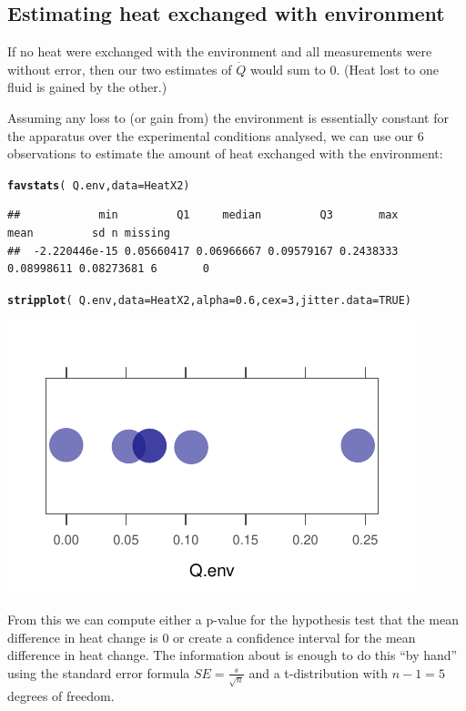 \documentclass[twoside]{book}\usepackage[]{graphicx}\usepackage[]{xcolor}
\makeatletter
\def\maxwidth{ %
  \ifdim\Gin@nat@width>\linewidth
    \linewidth
  \else
    \Gin@nat@width
  \fi
}
\newcommand{\hlnum}[1]{\textcolor[rgb]{0.686,0.059,0.569}{#1}}%
\newcommand{\hlopt}[1]{\textcolor[rgb]{0,0,0}{#1}}%
\newcommand{\hlstd}[1]{\textcolor[rgb]{0.345,0.345,0.345}{#1}}%
\newcommand{\hlkwc}[1]{\textcolor[rgb]{0.333,0.667,0.333}{#1}}%
\newcommand{\hlkwd}[1]{\textcolor[rgb]{0.737,0.353,0.396}{\textbf{#1}}}%
\newenvironment{kframe}{%
 \def\at@end@of@kframe{}%
 \ifinner\ifhmode%
  \def\at@end@of@kframe{\end{minipage}}%
  \begin{minipage}{\columnwidth}%
 \fi\fi%
 \def\FrameCommand##1{\hskip\@totalleftmargin \hskip-\fboxsep
 \colorbox{shadecolor}{##1}\hskip-\fboxsep
     \hskip-\linewidth \hskip-\@totalleftmargin \hskip\columnwidth}%
 \MakeFramed {\advance\hsize-\width
   \@totalleftmargin\z@ \linewidth\hsize
   \@setminipage}}%
 {\par\unskip\endMakeFramed%
 \at@end@of@kframe}
\newenvironment{knitrout}{}{} %
\makeatother
\begin{document}
\subsection{Estimating heat exchanged with environment}
If no heat were exchanged with the environment and all measurements were without error,
then our two estimates of $\dot Q$ would sum to 0.  (Heat lost to one fluid is gained by the 
other.)  

Assuming any loss to (or gain from) the environment is essentially constant for
the apparatus over the experimental conditions analysed, we can use our 6
observations to estimate the amount of heat exchanged with the environment:
\begin{knitrout}
\color{fgcolor}\begin{kframe}
\begin{alltt}
\hlkwd{favstats}\hlstd{(}\hlopt{~}\hlstd{Q.env,} \hlkwc{data} \hlstd{= HeatX2)}
\end{alltt}
\begin{verbatim}
##            min         Q1     median         Q3       max       mean         sd n missing
##  -2.220446e-15 0.05660417 0.06966667 0.09579167 0.2438333 0.08998611 0.08273681 6       0
\end{verbatim}
\begin{alltt}
\hlkwd{stripplot}\hlstd{(}\hlopt{~}\hlstd{Q.env,} \hlkwc{data} \hlstd{= HeatX2,} \hlkwc{alpha} \hlstd{=} \hlnum{0.6}\hlstd{,} \hlkwc{cex} \hlstd{=} \hlnum{3}\hlstd{,} \hlkwc{jitter.data} \hlstd{=} \hlnum{TRUE}\hlstd{)}
\end{alltt}
\end{kframe}

{\centering \includegraphics[width=\maxwidth]{figures/fig-unnamed-chunk-298-1} 

}



\end{knitrout}
From this we can compute either a p-value for the hypothesis test that the mean 
difference in heat change is 0 or create a confidence interval for the mean difference
in heat change.
The information about is enough to do this ``by hand'' using the standard error 
formula $SE = \frac{s}{\sqrt{n}}$ and a t-distribution with $n-1 = 5$ degrees of freedom.
\end{document}
